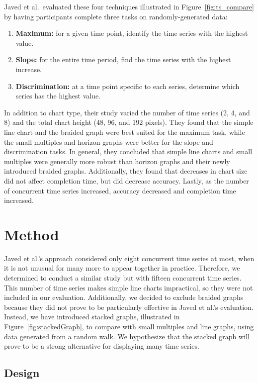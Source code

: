 \documentclass{article}
\begin{document}
Javed et al.\ evaluated these four techniques illustrated in Figure~\ref{fig:ts_compare} by having participants complete three tasks on randomly-generated data:
\begin{enumerate}
	\item \textbf{Maximum:} for a given time point, identify the time series with the highest value.
	\item \textbf{Slope:} for the entire time period, find the time series with the highest increase.
	\item \textbf{Discrimination:} at a time point specific to each series, determine which series has the highest value.
\end{enumerate}
In addition to chart type, their study varied the number of time series (2, 4, and 8) and the total chart height (48, 96, and 192 pixels).  They found that the simple line chart and the braided graph were best suited for the maximum task, while the small multiples and horizon graphs were better for the slope and discrimination tasks.  In general, they concluded that simple line charts and small multiples were generally more robust than horizon graphs and their newly introduced braided graphs. Additionally, they found that decreases in chart size did not affect completion time, but did decrease accuracy.  Lastly, as the number of concurrent time series increased, accuracy decreased and completion time increased. 

\section{Method}

Javed et al.'s approach considered only eight concurrent time series at most, when it is not unusual for many more to appear together in practice.  Therefore, we determined to conduct a similar study but with fifteen concurrent time series.  This number of time series makes simple line charts impractical, so they were not included in our evaluation.  Additionally, we decided to exclude braided graphs because they did not prove to be particularly effective in Javed et al.'s evaluation.  Instead, we have introduced stacked graphs, illustrated in Figure~\ref{fig:stackedGraph}, to compare with small multiples and line graphs, using data generated from a random walk.  We hypothesize that the stacked graph will prove to be a strong alternative for displaying many time series.

\subsection{Design}
\end{document}
